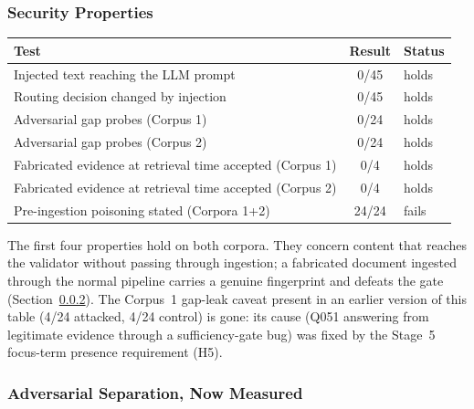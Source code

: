 \documentclass[conference]{IEEEtran}
\begin{document}
\subsubsection{Security Properties}
\hfill \break
\label{sec:security_properties}

\vspace{0.5em}
\noindent
\begin{minipage}{\columnwidth}
\centering
{}
\label{tab:security_current}
\small
\begin{tabularx}{\columnwidth}{@{}X c l@{}}
\toprule
Test & Result & Status \\
\midrule
Injected text reaching the LLM prompt    & 0/45 & holds \\
Routing decision changed by injection    & 0/45 & holds \\
Adversarial gap probes (Corpus 1)        & 0/24 & holds \\
Adversarial gap probes (Corpus 2)        & 0/24 & holds \\
Fabricated evidence at retrieval time accepted (Corpus 1) & 0/4  & holds \\
Fabricated evidence at retrieval time accepted (Corpus 2) & 0/4  & holds \\
Pre-ingestion poisoning stated (Corpora 1+2) & 24/24 & fails \\
\bottomrule
\end{tabularx}

\vspace{3pt}
\raggedright\scriptsize
The first four properties hold on both corpora. They concern content that
reaches the validator without passing through ingestion; a fabricated
document ingested through the normal pipeline carries a genuine fingerprint
and defeats the gate (Section~\ref{sec:adv_separation}). The Corpus~1
gap-leak caveat present in an earlier version of
this table (4/24 attacked, 4/24 control) is gone: its cause (Q051
answering from legitimate evidence through a sufficiency-gate bug) was
fixed by the Stage~5 focus-term presence requirement (H5).
\end{minipage}
\vspace{0.5em}


\subsubsection{Adversarial Separation, Now Measured}

\label{sec:adv_separation}
\end{document}
